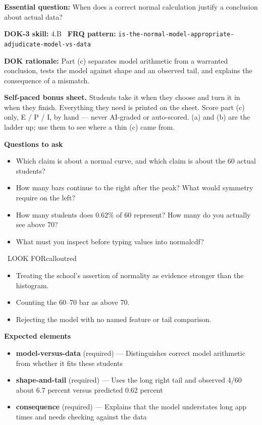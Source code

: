 \documentclass[11pt]{article}
\begin{document}
\textbf{Essential question:} When does a correct normal calculation justify a conclusion about actual data?\par
\textbf{DOK-3 skill:} 4.B \textperiodcentered\ \textbf{FRQ pattern:} {\small\texttt{is-\allowbreak{}the-\allowbreak{}normal-\allowbreak{}model-\allowbreak{}appropriate-\allowbreak{}adjudicate-\allowbreak{}model-\allowbreak{}vs-\allowbreak{}data}}\par
\textbf{DOK rationale:} Part (c) separates model arithmetic from a warranted conclusion, tests the model against shape and an observed tail, and explains the consequence of a mismatch.\par

\textbf{Self-paced bonus sheet.} Students take it when they choose and turn it in when they finish. Everything they need is printed on the sheet. Score part (c) only, E / P / I, by hand --- never AI-graded or auto-scored. (a) and (b) are the ladder up; use them to see where a thin (c) came from.\par

\textbf{Questions to ask}
\begin{itemize}[leftmargin=1.5em,itemsep=2pt,topsep=2pt]
  \item Which claim is about a normal curve, and which claim is about the 60 actual students?
  \item How many bars continue to the right after the peak? What would symmetry require on the left?
  \item How many students does $0.62\%$ of 60 represent? How many do you actually see above 70?
  \item What must you inspect before typing values into normalcdf?
\end{itemize}

\begin{callout}{\IconWarn\ LOOK FOR}{calloutred}
\begin{itemize}[leftmargin=1.5em,itemsep=2pt,topsep=2pt]
  \item Treating the school's assertion of normality as evidence stronger than the histogram.
  \item Counting the 60--70 bar as above 70.
  \item Rejecting the model with no named feature or tail comparison.
\end{itemize}
\end{callout}


\textbf{Expected elements}
\begin{itemize}[leftmargin=1.5em,itemsep=2pt,topsep=2pt]
  \item \textbf{model-versus-data} (required) --- Distinguishes correct model arithmetic from whether it fits these students
  \item \textbf{shape-and-tail} (required) --- Uses the long right tail and observed 4/60 about 6.7 percent versus predicted 0.62 percent
  \item \textbf{consequence} (required) --- Explains that the model understates long app times and needs checking against the data
\end{itemize}
\end{document}
